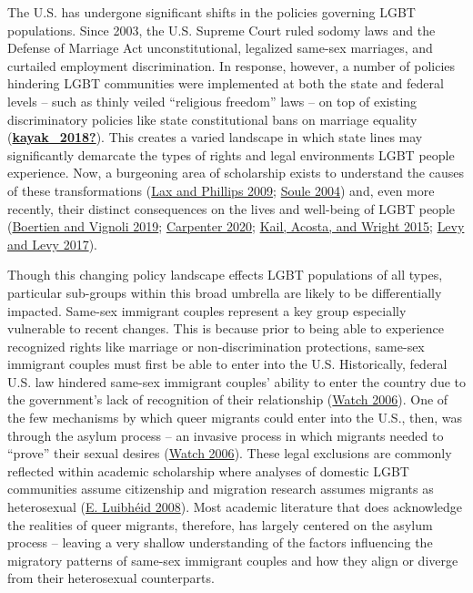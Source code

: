 \documentclass[
  11pt,
]{article}
\begin{document}
The U.S. has undergone significant shifts in the policies governing LGBT populations. Since 2003, the U.S. Supreme Court ruled sodomy laws and the Defense of Marriage Act unconstitutional, legalized same-sex marriages, and curtailed employment discrimination. In response, however, a number of policies hindering LGBT communities were implemented at both the state and federal levels -- such as thinly veiled ``religious freedom'' laws -- on top of existing discriminatory policies like state constitutional bans on marriage equality (\protect\hyperlink{ref-kayak_2018}{\textbf{kayak\_2018?}}). This creates a varied landscape in which state lines may significantly demarcate the types of rights and legal environments LGBT people experience. Now, a burgeoning area of scholarship exists to understand the causes of these transformations (\protect\hyperlink{ref-lax_2009}{Lax and Phillips 2009}; \protect\hyperlink{ref-soule_2004}{Soule 2004}) and, even more recently, their distinct consequences on the lives and well-being of LGBT people (\protect\hyperlink{ref-boertien_2019}{Boertien and Vignoli 2019}; \protect\hyperlink{ref-carpenter_2020}{Carpenter 2020}; \protect\hyperlink{ref-kail_2015}{Kail, Acosta, and Wright 2015}; \protect\hyperlink{ref-levy_2017}{Levy and Levy 2017}).

Though this changing policy landscape effects LGBT populations of all types, particular sub-groups within this broad umbrella are likely to be differentially impacted. Same-sex immigrant couples represent a key group especially vulnerable to recent changes. This is because prior to being able to experience recognized rights like marriage or non-discrimination protections, same-sex immigrant couples must first be able to enter into the U.S. Historically, federal U.S. law hindered same-sex immigrant couples' ability to enter the country due to the government's lack of recognition of their relationship (\protect\hyperlink{ref-humanrightswatch_2006}{Watch 2006}). One of the few mechanisms by which queer migrants could enter into the U.S., then, was through the asylum process -- an invasive process in which migrants needed to ``prove'' their sexual desires (\protect\hyperlink{ref-humanrightswatch_2006}{Watch 2006}). These legal exclusions are commonly reflected within academic scholarship where analyses of domestic LGBT communities assume citizenship and migration research assumes migrants as heterosexual (\protect\hyperlink{ref-luibheid_2008}{E. Luibhéid 2008}). Most academic literature that does acknowledge the realities of queer migrants, therefore, has largely centered on the asylum process -- leaving a very shallow understanding of the factors influencing the migratory patterns of same-sex immigrant couples and how they align or diverge from their heterosexual counterparts.
\end{document}

